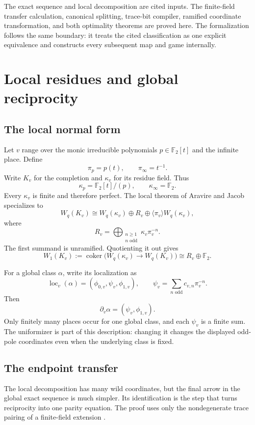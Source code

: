 \documentclass[11pt]{article}
\theoremstyle{definition}
\theoremstyle{remark}
\newcommand{\F}{\mathbb{F}}
\begin{document}
The exact sequence and local decomposition are cited inputs.  The
finite-field transfer calculation, canonical splitting, trace-bit compiler,
ramified coordinate transformation, and both optimality theorems are proved
here.  The formalization follows the same boundary: it treats the cited
classification as one explicit equivalence and constructs every subsequent
map and game internally.

\section{Local residues and global reciprocity}

\subsection{The local normal form}

Let $v$ range over the monic irreducible polynomials
$p\in\F_2[t]$ and the infinite place.  Define
\[
\pi_p=p(t),\qquad \pi_\infty=t^{-1}.
\]
Write $K_v$ for the completion and $\kappa_v$ for its residue field.  Thus
\[
\kappa_p=\F_2[t]/(p),\qquad \kappa_\infty=\F_2.
\]
Every $\kappa_v$ is finite and therefore perfect.  The local theorem of
Aravire and Jacob specializes to \cite[Theorem~1.3 and
Corollary~1.7]{aravirejacob2006}
\[
W_q(K_v)\cong
W_q(\kappa_v)\oplus R_v\oplus
\langle\pi_v\rangle W_q(\kappa_v),
\]
where
\[
R_v=\bigoplus_{\substack{n\ge1\\n\text{ odd}}}
\kappa_v\pi_v^{-n}.
\]
The first summand is unramified.  Quotienting it out gives
\[
W_1(K_v):=\operatorname{coker}
\bigl(W_q(\kappa_v)\longrightarrow W_q(K_v)\bigr)
\cong R_v\oplus\F_2.
\]

For a global class $\alpha$, write its localization as
\[
\operatorname{loc}_v(\alpha)
=(\phi_{0,v},\psi_v,\phi_{1,v}),
\qquad
\psi_v=\sum_{n\text{ odd}}c_{v,n}\pi_v^{-n}.
\]
Then
\[
\partial_v\alpha=(\psi_v,\phi_{1,v}).
\]
Only finitely many places occur for one global class, and each $\psi_v$ is a
finite sum.  The uniformizer is part of this description: changing it changes
the displayed odd-pole coordinates even when the underlying class is fixed.

\subsection{The endpoint transfer}

The local decomposition has many wild coordinates, but the final arrow in the
global exact sequence is much simpler.  Its identification is the step that
turns reciprocity into one parity equation.  The proof uses only the
nondegenerate trace pairing of a finite-field extension
\cite{lidlniederreiter1997}.
\end{document}

